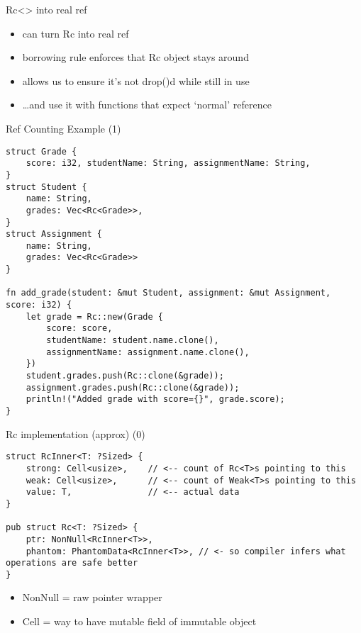 \begin{frame}{Rc<> into real ref}
    \begin{itemize}
    \item can turn Rc into real ref
    \item borrowing rule enforces that Rc object stays around
    \vspace{.5cm}
    \item allows us to ensure it's not drop()d while still in use
    \item \ldots and use it with functions that expect `normal' reference
    \end{itemize}
\end{frame}



\begin{frame}[fragile,label=refCountingEx]{Ref Counting Example (1)}
\begin{verbatim}
struct Grade {
    score: i32, studentName: String, assignmentName: String,
}
struct Student {
    name: String,
    grades: Vec<Rc<Grade>>,
}
struct Assignment {
    name: String,
    grades: Vec<Rc<Grade>>
}

fn add_grade(student: &mut Student, assignment: &mut Assignment, score: i32) {
    let grade = Rc::new(Grade {
        score: score,
        studentName: student.name.clone(),
        assignmentName: assignment.name.clone(),
    })
    student.grades.push(Rc::clone(&grade));
    assignment.grades.push(Rc::clone(&grade));
    println!("Added grade with score={}", grade.score);
}
\end{verbatim}
\end{frame}


\begin{frame}[fragile,label=rcImplA]{Rc implementation (approx) (0)}
\begin{verbatim}
struct RcInner<T: ?Sized> {
    strong: Cell<usize>,    // <-- count of Rc<T>s pointing to this
    weak: Cell<usize>,      // <-- count of Weak<T>s pointing to this
    value: T,               // <-- actual data
}

pub struct Rc<T: ?Sized> {
    ptr: NonNull<RcInner<T>>,
    phantom: PhantomData<RcInner<T>>, // <- so compiler infers what operations are safe better
}
\end{verbatim}
\begin{itemize}
\item NonNull = raw pointer wrapper
\item Cell = way to have mutable field of immutable object
\end{itemize}
\end{frame}



